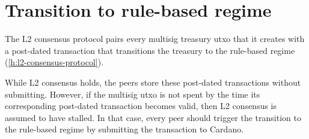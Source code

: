 \documentclass[../hydrozoa.tex]{subfiles}
\begin{document}
\section{Transition to rule-based regime}%
\label{h:l1-rule-based-transition}%

The L2 consensus protocol pairs every multisig treasury utxo that it creates with a post-dated transaction that transitions the treasury to the rule-based regime (\cref{h:l2-consensus-protocol}).

While L2 consensus holds, the peers store these post-dated transactions without submitting.
However, if the multisig utxo is not spent by the time its corresponding post-dated transaction becomes valid, then L2 consensus is assumed to have stalled.
In that case, every peer should trigger the transition to the rule-based regime by submitting the transaction to Cardano.
\end{document}
